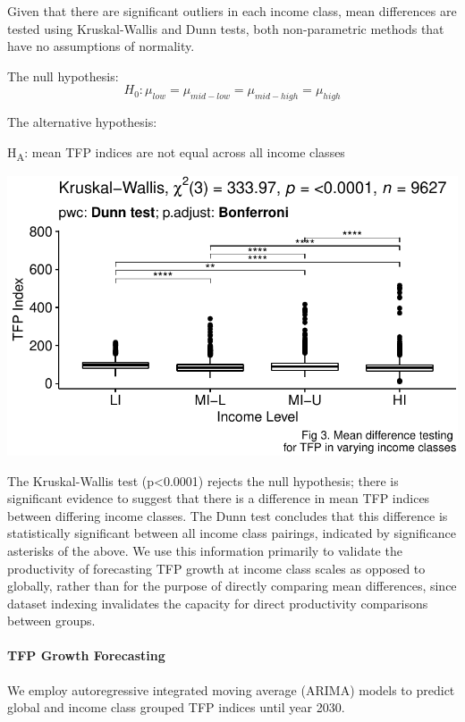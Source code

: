 \documentclass[
  letterpaper,
  DIV=11,
  numbers=noendperiod]{scrartcl}
\let\oldparagraph\paragraph
\renewcommand{\paragraph}[1]{\oldparagraph{#1}\mbox{}}
\begin{document}
Given that there are significant outliers in each income class, mean
differences are tested using Kruskal-Wallis and Dunn tests, both
non-parametric methods that have no assumptions of normality.

The null hypothesis:
\[H_0: \mu_{low}=\mu_{mid-low} = \mu_{mid-high} = \mu_{high}\]

The alternative hypothesis:

H\textsubscript{A}: mean TFP indices are not equal across all income
classes

\includegraphics{Smith_Gabrielle_EDS222Final_files/figure-pdf/unnamed-chunk-5-1.pdf}

The Kruskal-Wallis test (p\textless0.0001) rejects the null hypothesis;
there is significant evidence to suggest that there is a difference in
mean TFP indices between differing income classes. The Dunn test
concludes that this difference is statistically significant between all
income class pairings, indicated by significance asterisks of the above.
We use this information primarily to validate the productivity of
forecasting TFP growth at income class scales as opposed to globally,
rather than for the purpose of directly comparing mean differences,
since dataset indexing invalidates the capacity for direct productivity
comparisons between groups.

\hypertarget{tfp-growth-forecasting}{%
\paragraph{TFP Growth Forecasting}\label{tfp-growth-forecasting}}

We employ autoregressive integrated moving average (ARIMA) models to
predict global and income class grouped TFP indices until year 2030.
\end{document}
